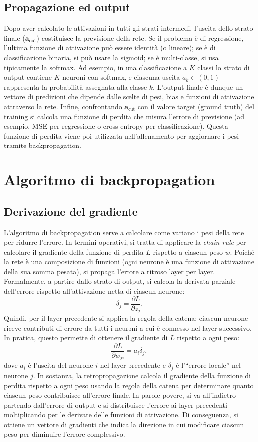 \documentclass[a4paper,12pt]{report}
\begin{document}
	\subsection{Propagazione ed output}
	Dopo aver calcolato le attivazioni in tutti gli strati intermedi, l'uscita dello strato finale ($\mathbf{a}_{\text{out}}$) costituisce la previsione della rete. Se il problema è di regressione, l'ultima funzione di attivazione può essere identità (o lineare); se è di classificazione binaria, si può usare la sigmoid; se è multi-classe, si usa tipicamente la softmax. Ad esempio, in una classificazione a $K$ classi lo strato di output contiene $K$ neuroni con softmax, e ciascuna uscita $a_k \in (0,1)$ rappresenta la probabilità assegnata alla classe $k$. L'output finale è dunque un vettore di predizioni che dipende dalle scelte di pesi, bias e funzioni di attivazione attraverso la rete. Infine, confrontando $\mathbf{a}_{\text{out}}$ con il valore target (ground truth) del training si calcola una funzione di perdita che misura l'errore di previsione (ad esempio, MSE per regressione o cross-entropy per classificazione). Questa funzione di perdita viene poi utilizzata nell'allenamento per aggiornare i pesi tramite backpropagation.
	
	\section{Algoritmo di backpropagation}
	
	\subsection{Derivazione del gradiente}
	L'algoritmo di backpropagation serve a calcolare come variano i pesi della rete per ridurre l'errore. In termini operativi, si tratta di applicare la \emph{chain rule} per calcolare il gradiente della funzione di perdita $L$ rispetto a ciascun peso $w$. Poiché la rete è una composizione di funzioni (ogni neurone è una funzione di attivazione della sua somma pesata), si propaga l'errore a ritroso layer per layer. Formalmente, a partire dallo strato di output, si calcola la derivata parziale dell'errore rispetto all'attivazione netta di ciascun neurone:
	\[
	\delta_j = \frac{\partial L}{\partial z_j}.
	\]
	Quindi, per il layer precedente si applica la regola della catena: ciascun neurone riceve contributi di errore da tutti i neuroni a cui è connesso nel layer successivo. In pratica, questo permette di ottenere il gradiente di $L$ rispetto a ogni peso:
	\[
	\frac{\partial L}{\partial w_{ji}} = a_i \delta_j,
	\]
	dove $a_i$ è l'uscita del neurone $i$ nel layer precedente e $\delta_j$ è l'``errore locale'' nel neurone $j$. In sostanza, la retropropagazione calcola il gradiente della funzione di perdita rispetto a ogni peso usando la regola della catena per determinare quanto ciascun peso contribuisce all'errore finale. In parole povere, si va all'indietro partendo dall'errore di output e si distribuisce l'errore ai layer precedenti moltiplicando per le derivate delle funzioni di attivazione. Di conseguenza, si ottiene un vettore di gradienti che indica la direzione in cui modificare ciascun peso per diminuire l'errore complessivo.
	
\end{document}
